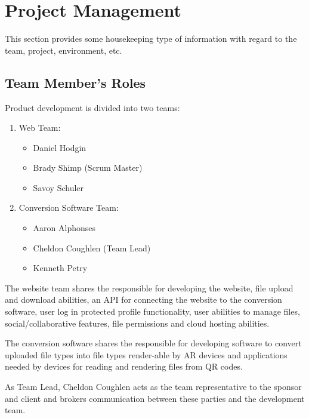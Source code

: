 

\chapter{Project Management}
This section provides some housekeeping type of information with regard to the 
team, project, environment, etc. 



\section{Team Member's Roles}

Product development is divided into two teams:
\begin{enumerate}
    \item Web Team:
        \begin{itemize}
            \item Daniel Hodgin
            \item Brady Shimp (Scrum Master)
            \item Savoy Schuler
        \end{itemize}
    \item Conversion Software Team:
        \begin{itemize}
            \item Aaron Alphonses
            \item Cheldon Coughlen (Team Lead)
            \item Kenneth Petry
        \end{itemize}
\end{enumerate}

The website team shares the responsible for developing the website, file upload and download abilities, an API for connecting the website to the conversion software, user log in protected profile functionality, user abilities to manage files, social/collaborative features, file permissions and cloud hosting abilities.  


The conversion software shares the responsible for developing software to convert uploaded file types into file types render-able by AR devices and applications needed by devices for reading and rendering files from QR codes.


As Team Lead, Cheldon Coughlen acts as the team representative to the sponsor and client and brokers communication between these parties and the development team. 

